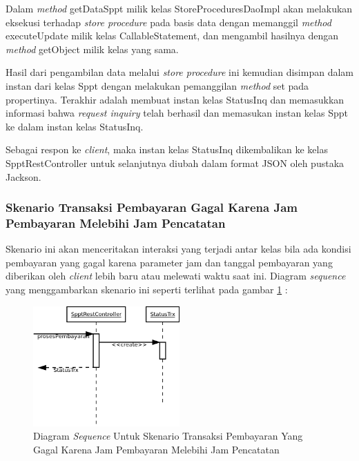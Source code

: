 \documentclass[pdftex,12pt, oneside]{article}
\begin{document}
Dalam \textit{method} getDataSppt milik kelas StoreProceduresDaoImpl akan melakukan eksekusi terhadap \textit{store procedure} pada basis data dengan memanggil \textit{method} executeUpdate milik kelas CallableStatement, dan mengambil hasilnya dengan \textit{method} getObject milik kelas yang sama.

Hasil dari pengambilan data melalui \textit{store procedure} ini kemudian disimpan dalam instan dari kelas Sppt dengan melakukan pemanggilan \textit{method} set pada propertinya. Terakhir adalah membuat instan kelas StatusInq dan memasukkan informasi bahwa \textit{request inquiry} telah berhasil dan memasukan instan kelas Sppt ke dalam instan kelas StatusInq.

Sebagai respon ke \textit{client}, maka instan kelas StatusInq dikembalikan ke kelas SpptRestController untuk selanjutnya diubah dalam format JSON oleh pustaka Jackson.

\subsubsection{Skenario Transaksi Pembayaran Gagal Karena Jam Pembayaran Melebihi Jam Pencatatan}

Skenario ini akan menceritakan interaksi yang terjadi antar kelas bila ada kondisi pembayaran yang gagal karena parameter jam dan tanggal pembayaran yang diberikan oleh \textit{client} lebih baru atau melewati waktu saat ini. Diagram \textit{sequence} yang menggambarkan skenario ini seperti terlihat pada gambar \ref{fig:uml-seq-trx-tgl-bayar-error} :

\begin{figure}[H]
  \centering
  \includegraphics[width=0.5\textwidth]{./resources/diagram/uml-seq-trx-tgl-bayar-error}
  \caption{Diagram \textit{Sequence} Untuk Skenario Transaksi Pembayaran Yang Gagal Karena Jam Pembayaran Melebihi Jam Pencatatan}
  \label{fig:uml-seq-trx-tgl-bayar-error}
\end{figure}
\end{document}
